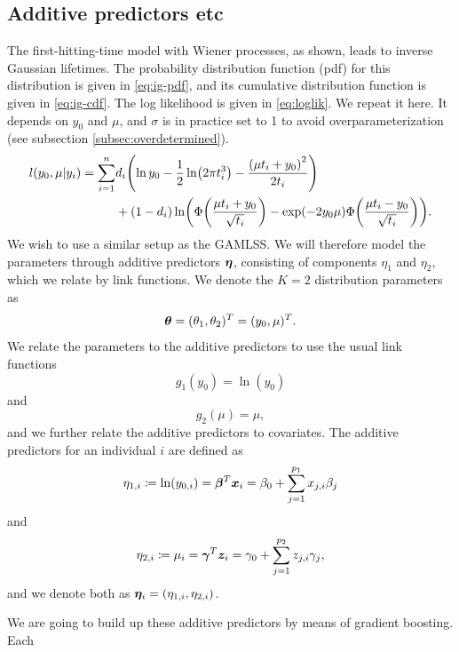 \subsection{Additive predictors etc}
The first-hitting-time model with Wiener processes, as shown, leads to inverse Gaussian lifetimes.
The probability distribution function (pdf) for this distribution is given in \eqref{eq:ig-pdf}, and its cumulative distribution function is given in \eqref{eq:ig-cdf}.
The log likelihood is given in \eqref{eq:loglik}.
We repeat it here.
It depends on $y_0$ and $\mu$, and $\sigma$ is in practice set to 1 to avoid overparameterization (see subsection \ref{subsec:overdetermined}).
\begin{align*}
\begin{split}
    l(y_0,\mu|y_i)=\sum_{i=1}^n&d_i\p*{\ln y_0-\frac{1}{2}\ln\p*{2\pi\ti^3}-\frac{\p*{\mu\ti+y_0}^2}{2\ti}} \\
    &+
    (1-d_i)\ln\p*{\Phi\p*{\frac{\mu\ti+y_0}{\sqrt{\ti}}}-\exp\p*{-2y_0\mu}\Phi\p*{\frac{\mu\ti-y_0}{\sqrt{\ti}}}}.
\end{split}
\end{align*}
We wish to use a similar setup as the GAMLSS.
We will therefore model the parameters through additive predictors $\boldsymbol{\eta}$, consisting of components $\eta_1$ and $\eta_2$, which we relate by link functions.
We denote the $K=2$ distribution parameters as
\begin{equation}
    \boldsymbol{\theta}=(\theta_1,\theta_2)^T=(y_0,\mu)^T.
\end{equation}
We relate the parameters to the additive predictors to use the usual link functions
\begin{equation}
    g_1(y_0)=\ln(y_0)
\end{equation}
and
\begin{equation}
    g_2(\mu)=\mu,
\end{equation}
and we further relate the additive predictors to covariates.
The additive predictors for an individual $i$ are defined as
\begin{equation}
    \eta_{1,i}\coloneqq \ln(y_{0,i})=\boldsymbol{\beta}^T \bm{x}_i=\beta_{0}+\sum_{j=1}^{p_1}x_{j,i}\beta_j
\end{equation}
and
\begin{equation}
    \eta_{2,i}\coloneqq \mu_{i}=\boldsymbol{\gamma}^T \bm{z}_i=\gamma_{0}+\sum_{j=1}^{p_2}z_{j,i}\gamma_j,
\end{equation}
and we denote both as $\boldsymbol{\eta}_i=\left(\eta_{1,i},\eta_{2,i}\right)$.

We are going to build up these additive predictors by means of gradient boosting.
Each 

